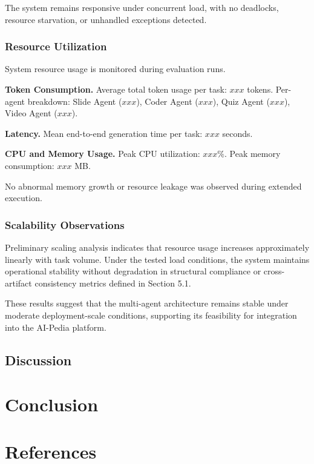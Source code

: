 \documentclass[10pt,journal,compsoc]{IEEEtran}
\begin{document}
The system remains responsive under concurrent load, with no deadlocks, resource starvation, or unhandled exceptions detected.

\subsubsection{Resource Utilization}

System resource usage is monitored during evaluation runs.

\textbf{Token Consumption.}  
Average total token usage per task: $xxx$ tokens.  
Per-agent breakdown: Slide Agent ($xxx$), Coder Agent ($xxx$), Quiz Agent ($xxx$), Video Agent ($xxx$).

\textbf{Latency.}  
Mean end-to-end generation time per task: $xxx$ seconds.

\textbf{CPU and Memory Usage.}  
Peak CPU utilization: $xxx\%$.  
Peak memory consumption: $xxx$ MB.

No abnormal memory growth or resource leakage was observed during extended execution.

\subsubsection{Scalability Observations}

Preliminary scaling analysis indicates that resource usage increases approximately linearly with task volume. Under the tested load conditions, the system maintains operational stability without degradation in structural compliance or cross-artifact consistency metrics defined in Section 5.1.

These results suggest that the multi-agent architecture remains stable under moderate deployment-scale conditions, supporting its feasibility for integration into the AI-Pedia platform.
\subsection{Discussion}


\section{Conclusion}

\newpage
\section*{References}
\end{document}
